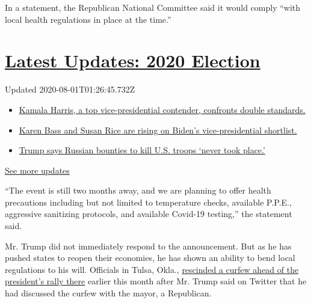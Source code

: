 In a statement, the Republican National Committee said it would comply
``with local health regulations in place at the time.''

\hypertarget{latest-updates-2020-election}{%
\section{\texorpdfstring{\href{https://www.nytimes.com/2020/07/31/us/elections/biden-vs-trump.html?action=click\&pgtype=Article\&state=default\&region=MAIN_CONTENT_1\&context=storylines_live_updates}{Latest
Updates: 2020
Election}}{Latest Updates: 2020 Election}}\label{latest-updates-2020-election}}

Updated 2020-08-01T01:26:45.732Z

\begin{itemize}
\tightlist
\item
  \href{https://www.nytimes.com/2020/07/31/us/elections/biden-vs-trump.html?action=click\&pgtype=Article\&state=default\&region=MAIN_CONTENT_1\&context=storylines_live_updates\#link-29fdff45}{Kamala
  Harris, a top vice-presidential contender, confronts double
  standards.}
\item
  \href{https://www.nytimes.com/2020/07/31/us/elections/biden-vs-trump.html?action=click\&pgtype=Article\&state=default\&region=MAIN_CONTENT_1\&context=storylines_live_updates\#link-13ec3d9c}{Karen
  Bass and Susan Rice are rising on Biden's vice-presidential
  shortlist.}
\item
  \href{https://www.nytimes.com/2020/07/31/us/elections/biden-vs-trump.html?action=click\&pgtype=Article\&state=default\&region=MAIN_CONTENT_1\&context=storylines_live_updates\#link-49e9a016}{Trump
  says Russian bounties to kill U.S. troops `never took place.'}
\end{itemize}

\href{https://www.nytimes.com/2020/07/31/us/elections/biden-vs-trump.html?action=click\&pgtype=Article\&state=default\&region=MAIN_CONTENT_1\&context=storylines_live_updates}{See
more updates}

``The event is still two months away, and we are planning to offer
health precautions including but not limited to temperature checks,
available P.P.E., aggressive sanitizing protocols, and available
Covid-19 testing,'' the statement said.

Mr. Trump did not immediately respond to the announcement. But as he has
pushed states to reopen their economies, he has shown an ability to bend
local regulations to his will. Officials in Tulsa, Okla.,
\href{https://www.nytimes.com/2020/06/19/us/politics/trump-tweet-tulsa-protests.html}{rescinded
a curfew ahead of the president's rally there} earlier this month after
Mr. Trump said on Twitter that he had discussed the curfew with the
mayor, a Republican.

